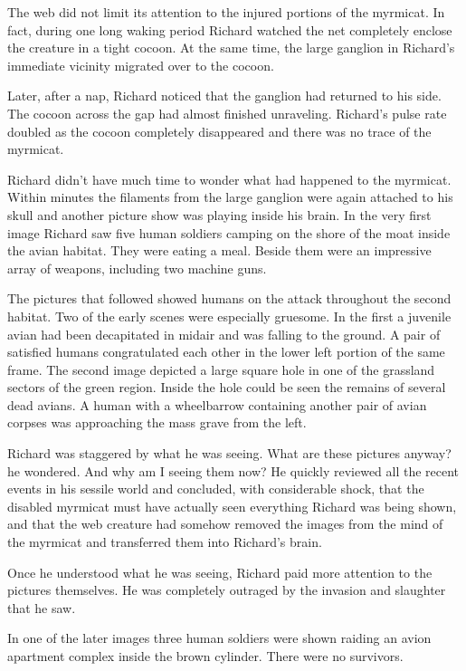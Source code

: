 \documentclass[]{article}
\begin{document}
{{The web did not limit its attention to the injured portions of the myrmicat.  In fact, during one long waking period Richard watched the net completely enclose the creature in a tight cocoon.  At the same time, the large ganglion in Richard’s immediate vicinity migrated over to the cocoon.

Later, after a nap, Richard noticed that the ganglion had returned to his side.  The cocoon across the gap had almost finished unraveling.  Richard’s pulse rate doubled as the cocoon completely disappeared and there was no trace of the myrmicat.

Richard didn’t have much time to wonder what had happened to the myrmicat.  Within minutes the filaments from the large ganglion were again attached to his skull and another picture show was playing inside his brain.  In the very first image Richard saw five human soldiers camping on the shore of the moat inside the avian habitat.  They were eating a meal.  Beside them were an impressive array of weapons, including two machine guns.

The pictures that followed showed humans on the attack throughout the second habitat.  Two of the early scenes were especially gruesome.  In the first a juvenile avian had been decapitated in midair and was falling to the ground.  A pair of satisfied humans congratulated each other in the lower left portion of the same frame.  The second image depicted a large square hole in one of the grassland sectors of the green region.  Inside the hole could be seen the remains of several dead avians.  A human with a wheelbarrow containing another pair of avian corpses was approaching the mass grave from the left.

Richard was staggered by what he was seeing.  What are these pictures anyway? he wondered.  And why am I seeing them now? He quickly reviewed all the recent events in his sessile world and concluded, with considerable shock, that the disabled myrmicat must have actually seen everything Richard was being shown, and that the web creature had somehow removed the images from the mind of the myrmicat and transferred them into Richard’s brain.

Once he understood what he was seeing, Richard paid more attention to the pictures themselves.  He was completely outraged by the invasion and slaughter that he saw.

In one of the later images three human soldiers were shown raiding an avion apartment complex inside the brown cylinder.  There were no survivors.

}}
\end{document}
